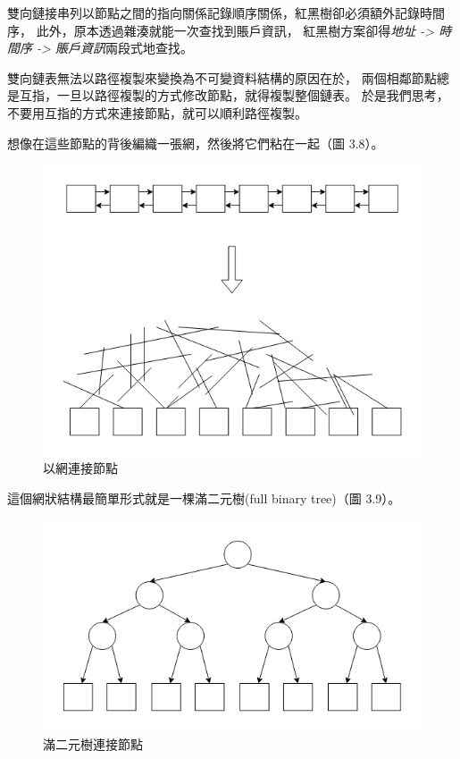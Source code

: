 雙向鏈接串列以節點之間的指向關係記錄順序關係，紅黑樹卻必須額外記錄時間序，
此外，原本透過雜湊就能一次查找到賬戶資訊，
紅黑樹方案卻得\emph{地址 -> 時間序 -> 賬戶資訊}兩段式地查找。

雙向鏈表無法以路徑複製來變換為不可變資料結構的原因在於，
兩個相鄰節點總是互指，一旦以路徑複製的方式修改節點，就得複製整個鏈表。
於是我們思考，不要用互指的方式來連接節點，就可以順利路徑複製。

想像在這些節點的背後編織一張網，然後將它們粘在一起（圖 3.8）。

\begin{figure}[h!]
\includegraphics[width=\textwidth]{節點網}
\caption{以網連接節點}
\end{figure}

這個網狀結構最簡單形式就是一棵滿二元樹(full binary tree)（圖 3.9）。

\begin{figure}[h!]
\includegraphics[width=\textwidth]{滿二元樹}
\caption{滿二元樹連接節點}
\end{figure}

